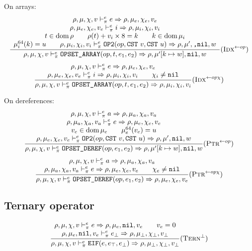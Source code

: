 On arrays:
\[\dfrac{\begin{array}{c}
    \rho,\mu,\chi,v \vdash_\pi^e e\Rightarrow \rho,\mu_e,\chi_e,v_e \\
    \rho,\mu_e,\chi_e,v_e \vdash_\pi^e i\Rightarrow \rho,\mu_i,\chi_i,v_i \\
    t\in\operatorname{dom}\rho \qquad \rho(t)+v_i\times8 = k \qquad k\in\operatorname{dom}\mu_i\\
    \mu_i^{64}(k) = u \qquad \rho,\mu_i,\chi_i,v_i \vdash_\pi^e \texttt{OP2}(op, \texttt{CST}\ v, \texttt{CST}\ u) \Rightarrow \rho,\mu',\texttt{,}\texttt{nil},w
\end{array}}{\rho,\mu,\chi,v \vdash_\pi^e \texttt{OPSET\_ARRAY}(op, t, e_1, e_2) \Rightarrow \rho,\mu'[k\mapsto w],\texttt{nil},w} (\textsc{Idx}^{\gets op})\]
\[\dfrac{\begin{array}{c}
    \rho,\mu,\chi,v \vdash_\pi^e e\Rightarrow \rho,\mu_e,\chi_e,v_e \\
    \rho,\mu_e,\chi_e,v_e \vdash_\pi^e i\Rightarrow \rho,\mu_i,\chi_i,v_i \qquad \chi_i\ne\texttt{nil}\\
\end{array}}{\rho,\mu,\chi,v \vdash_\pi^e \texttt{OPSET\_ARRAY}(op, t, e_1, e_2) \Rightarrow \rho,\mu_i,\chi_i,v_i} (\textsc{Idx}^{\gets op\chi})\]

On dereferences:
\[\dfrac{\begin{array}{c}
    \rho,\mu,\chi,v \vdash_\pi^e a\Rightarrow \rho,\mu_a,\chi_a,v_a \\
    \rho,\mu_a,\chi_a,v_a \vdash_\pi^e e\Rightarrow \rho,\mu_e,\chi_e,v_e \\
    v_e\in\operatorname{dom}\mu_e \qquad \mu_e^{64}(v_e) = u \\
    \rho,\mu_e,\chi_e,v_e \vdash_\pi^e \texttt{OP2}(op, \texttt{CST}\ v, \texttt{CST}\ u) \Rightarrow \rho,\mu',\texttt{nil},w
\end{array}}{\rho,\mu,\chi,v \vdash_\pi^e \texttt{OPSET\_DEREF}(op, e_1, e_2) \Rightarrow \rho,\mu'[k\mapsto w],\texttt{nil},w} (\textsc{Ptr}^{\gets op})\]
\[\dfrac{\begin{array}{c}
    \rho,\mu,\chi,v \vdash_\pi^e a\Rightarrow \rho,\mu_a,\chi_a,v_a \\
    \rho,\mu_a,\chi_a,v_a \vdash_\pi^e e\Rightarrow \rho,\mu_e,\chi_e,v_e \qquad \chi_e\ne\texttt{nil} \\
\end{array}}{\rho,\mu,\chi,v \vdash_\pi^e \texttt{OPSET\_DEREF}(op, e_1, e_2) \Rightarrow \rho,\mu_e,\chi_e,v_e} (\textsc{Ptr}^{\gets op\chi})\]

\subsection{Ternary operator}
\[\dfrac{\begin{array}{c}
    \rho,\mu,\chi,v \vdash_\pi^e e\Rightarrow \rho,\mu_e,\texttt{nil},v_e \qquad v_e = 0\\
    \rho,\mu_e,\texttt{nil},v_e \vdash_\pi^e e_\bot \Rightarrow \rho,\mu_\bot,\chi_\bot,v_\bot
\end{array}}{\rho,\mu,\chi,v \vdash_\pi^e \texttt{EIF}(e, e_\top, e_\bot) \Rightarrow \rho,\mu_\bot,\chi_\bot,v_\bot}(\textsc{Tern}^\bot)\]

